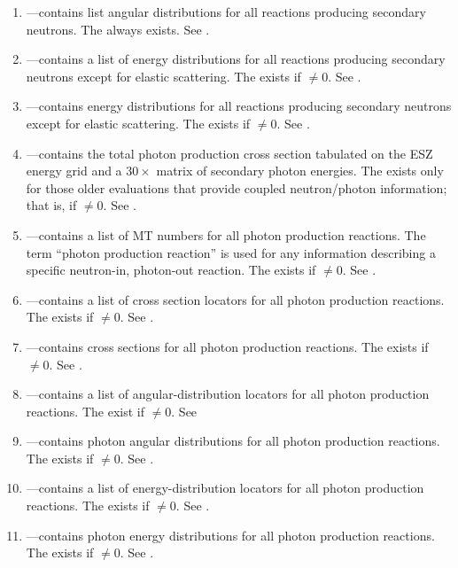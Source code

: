 \begin{enumerate}
  \item \textbf{}---contains list angular distributions for all reactions producing secondary neutrons. The  always exists. See .
  \item \textbf{}---contains a list of energy distributions for all reactions producing secondary neutrons except for elastic scattering. The  exists if $\neq0$. See .
  \item \textbf{}---contains energy distributions for all reactions producing secondary neutrons except for elastic scattering. The  exists if $\neq0$. See .
  \item \textbf{}---contains the total photon production cross section tabulated on the ESZ energy grid and a $30\times$ matrix of secondary photon energies. The  exists only for those older evaluations that provide coupled neutron/photon information; that is, if $\neq0$. See .
  \item \textbf{}---contains a list of MT numbers for all photon production reactions. The term ``photon production reaction'' is used for any information describing a specific neutron-in, photon-out reaction. The  exists if $\neq0$. See .
  \item \textbf{}---contains a list of cross section locators for all photon production reactions. The  exists if $\neq0$. See .
  \item \textbf{}---contains cross sections for all photon production reactions. The  exists if $\neq0$. See .
  \item \textbf{}---contains a list of angular-distribution locators for all photon production reactions. The  exist if $\neq0$. See 
  \item \textbf{}---contains photon angular distributions for all photon production reactions. The  exists if $\neq0$. See .
  \item \textbf{}---contains a list of energy-distribution locators for all photon production reactions. The  exists if $\neq0$. See .
  \item \textbf{}---contains photon energy distributions for all photon production reactions. The  exists if $\neq0$. See .

\end{enumerate}
